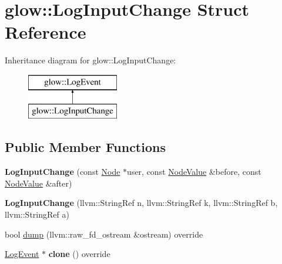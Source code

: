 \hypertarget{structglow_1_1_log_input_change}{}\section{glow\+:\+:Log\+Input\+Change Struct Reference}
\label{structglow_1_1_log_input_change}
Inheritance diagram for glow\+:\+:Log\+Input\+Change\+:\begin{figure}[H]
\begin{center}
\leavevmode
\includegraphics[height=2.000000cm]{structglow_1_1_log_input_change}
\end{center}
\end{figure}
\subsection*{Public Member Functions}
\begin{DoxyCompactItemize}
\item 
\mbox{\label{structglow_1_1_log_input_change_a988a2dcd28f3936482fb229333460165}} 
{\bfseries Log\+Input\+Change} (const \hyperlink{classglow_1_1_node}{Node} $\ast$user, const \hyperlink{structglow_1_1_node_value}{Node\+Value} \&before, const \hyperlink{structglow_1_1_node_value}{Node\+Value} \&after)
\item 
\mbox{\label{structglow_1_1_log_input_change_a487b711c038361b6cd56e846c9fff81d}} 
{\bfseries Log\+Input\+Change} (llvm\+::\+String\+Ref n, llvm\+::\+String\+Ref k, llvm\+::\+String\+Ref b, llvm\+::\+String\+Ref a)
\item 
bool \hyperlink{structglow_1_1_log_input_change_abe24dc999f25edf277ec308940827431}{dump} (llvm\+::raw\+\_\+fd\+\_\+ostream \&ostream) override
\item 
\mbox{\label{structglow_1_1_log_input_change_a58d3a45f90c684d0ac571ffe7194c37b}} 
\hyperlink{structglow_1_1_log_event}{Log\+Event} $\ast$ {\bfseries clone} () override
\end{DoxyCompactItemize}
